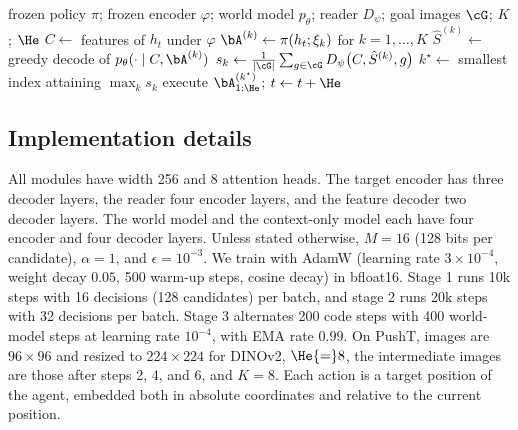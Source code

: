 \begin{algorithm}[t]
\caption{Policy-guided planning with \method.}
\label{alg:cta}
\small
\begin{algorithmic}[1]
\Require frozen policy $\pi$; frozen encoder $\varphi$; world model $p_\theta$; reader $D_\psi$; goal images $\cG$; $K$; $\He$
  \State $C\gets$ features of $h_t$ under $\varphi$ 
  \State $\bA^{(k)}\gets\pi(h_t;\xi_k)$ for $k=1,\dots,K$ 
  \State $\hat S^{(k)}\gets$ greedy decode of $p_\theta(\cdot\mid C,\bA^{(k)})$ 
  \State $s_k\gets\frac{1}{|\cG|}\sum_{g\in\cG}D_\psi\big(C,\hat S^{(k)},g\big)$
  \State $k^\star\gets$ smallest index attaining $\max_k s_k$ 
  \State execute $\bA^{(k^\star)}_{1:\He}$; $t\gets t+\He$
\EndWhile
\end{algorithmic}
\end{algorithm}

\subsection{Implementation details}
\label{sec:impl}
All modules have width 256 and 8 attention heads.
The target encoder has three decoder layers, the reader four encoder layers, and the feature decoder two decoder layers.
The world model and the context-only model each have four encoder and four decoder layers.
Unless stated otherwise, $M{=}16$ (128 bits per candidate), $\alpha{=}1$, and $\epsilon{=}10^{-3}$.
We train with AdamW (learning rate $3{\times}10^{-4}$, weight decay $0.05$, 500 warm-up steps, cosine decay) in bfloat16.
Stage 1 runs 10k steps with 16 decisions (128 candidates) per batch, and stage 2 runs 20k steps with 32 decisions per batch.
Stage 3 alternates 200 code steps with 400 world-model steps at learning rate $10^{-4}$, with EMA rate $0.99$.
On PushT, images are $96{\times}96$ and resized to $224{\times}224$ for DINOv2, $\He{=}8$, the intermediate images are those after steps 2, 4, and 6, and $K{=}8$.
Each action is a target position of the agent, embedded both in absolute coordinates and relative to the current position.
